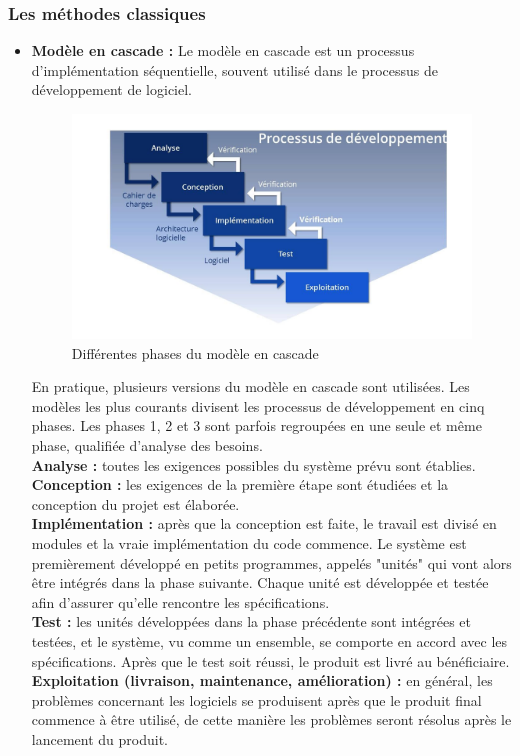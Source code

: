\documentclass[a4paper, 12pt]{report}
\begin{document}
\subsubsection{Les méthodes classiques}
\begin{itemize}
  \item \textbf{Modèle en cascade :} Le modèle en cascade est un processus d'implémentation séquentielle, souvent utilisé dans le processus de développement de logiciel. 
\begin{figure}[!h]
\centering
\includegraphics[width = 1\linewidth]{img/wasserfallmodell.jpg}
\caption{Différentes phases du modèle en cascade}
\end{figure}\cite{modele_en_cascade}
En pratique, plusieurs versions du modèle en cascade sont utilisées. Les modèles les plus courants divisent les processus de développement en cinq phases. Les phases 1, 2 et 3 sont parfois regroupées en une seule et même phase, qualifiée d’analyse des besoins. \\
\textbf{ Analyse :} toutes les exigences possibles du système prévu sont établies. \\
\textbf{ Conception :} les exigences de la première étape sont étudiées et la conception du projet est élaborée. \\
\textbf{ Implémentation :} après que la conception est faite, le travail est divisé en modules et la vraie implémentation du code commence. Le système est premièrement développé en petits programmes, appelés "unités" qui vont alors être intégrés dans la phase suivante. Chaque unité est développée et testée afin d'assurer qu'elle rencontre les spécifications. \\
\textbf{ Test :} les unités développées dans la phase précédente sont intégrées et testées, et le système, vu comme un ensemble, se comporte en accord avec les spécifications. Après que le test soit réussi, le produit est livré au bénéficiaire.\\
\textbf{ Exploitation (livraison, maintenance, amélioration) :} en général, les problèmes concernant les logiciels se produisent après que le produit final commence à être utilisé, de cette manière les problèmes seront résolus après le lancement du produit. \\


\end{itemize}
\end{document}
